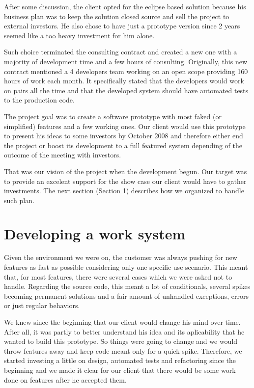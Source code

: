 \documentclass[lnbip]{svmultln}
\begin{document}
After some discussion, the client opted for the eclipse based solution
because his business plan was to keep the solution closed source and
sell the project to external investors. He also chose to have just a
prototype version since 2 years seemed like a too heavy investment for
him alone.

Such choice terminated the consulting contract and created a new one
with a majority of development time and a few hours of
consulting. Originally, this new contract mentioned a 4 developers
team working on an open scope providing 160 hours of work each
month. It specifically stated that the developers would work on pairs
all the time and that the developed system should have automated tests
to the production code.

The project goal was to create a software prototype with most faked
(or simplified) features and a few working ones. Our client would use
this prototype to present his ideas to some investors by October 2008
and therefore either end the project or boost its development to a
full featured system depending of the outcome of the meeting with
investors.

That was our vision of the project when the development begun. Our
target was to provide an excelent support for the show case our client
would have to gather investments. The next section (Section
\ref{sec:working}) describes how we organized to handle such plan.

\section{Developing a work system}
\label{sec:working}

Given the environment we were on, the customer was always pushing for
new features as fast as possible considering only one specific use
scenario. This meant that, for most features, there were several cases
which we were asked not to handle. Regarding the source code, this
meant a lot of conditionals, several spikes becoming permanent
solutions and a fair amount of unhandled exceptions, errors or just
regular behaviors.

We knew since the beginning that our client would change his mind over
time. After all, it was partly to better understand his idea and its
aplicability that he wanted to build this prototype. So things were
going to change and we would throw features away and keep code meant
only for a quick spike. Therefore, we started investing a little on
design, automated tests and refactoring since the beginning and we
made it clear for our client that there would be some work done on
features after he accepted them.
\end{document}
